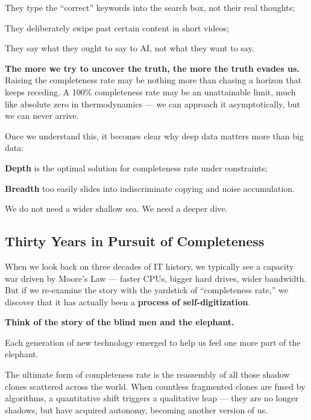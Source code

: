 {\kaiti
They type the ``correct'' keywords into the search box, not their real thoughts;

They deliberately swipe past certain content in short videos;

They say what they ought to say to AI, not what they want to say.
}
\vspace{1em}

\textbf{The more we try to uncover the truth, the more the truth evades us.}
Raising the completeness rate may be nothing more than chasing a horizon that keeps receding.
A 100\% completeness rate may be an unattainable limit, much like absolute zero in thermodynamics --- we can approach it asymptotically, but we can never arrive.

\vspace{1em}

Once we understand this,
it becomes clear why deep data matters more than big data:

\textbf{Depth} is the optimal solution for completeness rate under constraints;

\textbf{Breadth} too easily slides into indiscriminate copying and noise accumulation.

We do not need a wider shallow sea.
We need a deeper dive.


\newpage
\subsection{Thirty Years in Pursuit of Completeness}

When we look back on three decades of IT history, we typically see a capacity war driven by Moore's Law --- faster CPUs, bigger hard drives, wider bandwidth.
But if we re-examine the story with the yardstick of ``completeness rate,'' we discover that it has actually been a \textbf{process of self-digitization}.

\vspace{1em}

\textbf{Think of the story of the blind men and the elephant.}

Each generation of new technology emerged to help us feel one more part of the elephant.

The ultimate form of completeness rate is the reassembly of all those shadow clones scattered across the world. When countless fragmented clones are fused by algorithms, a quantitative shift triggers a qualitative leap --- they are no longer shadows, but have acquired autonomy, becoming another version of us.

